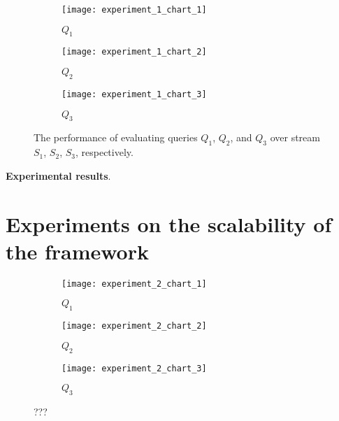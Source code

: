 \begin{figure}[H]
     \begin{adjustbox}{max width=1.5\linewidth,center}
     \centering
     \begin{subfigure}[b]{0.45\textwidth}
         \centering
         \texttt{[image: experiment\_1\_chart\_1]}
         \caption{$Q_{1}$}
         \label{fig:experiment:1:subfigure:1}
     \end{subfigure}
     \hfill
     \begin{subfigure}[b]{0.45\textwidth}
         \centering
         \texttt{[image: experiment\_1\_chart\_2]}
         \caption{$Q_{2}$}
         \label{fig:experiment:1:subfigure:2}
     \end{subfigure}
     \hfill
     \begin{subfigure}[b]{0.45\textwidth}
         \centering
         \texttt{[image: experiment\_1\_chart\_3]}
         \caption{$Q_{3}$}
         \label{fig:experiment:1:subfigure:3}
     \end{subfigure}
     \end{adjustbox}
     \caption{The performance of evaluating queries $Q_{1}$, $Q_{2}$, and $Q_{3}$ over stream $S_{1}$, $S_{2}$, $S_{3}$, respectively.}
     \label{fig:experiment:1}
\end{figure}

\textbf{Experimental results}.

\section{Experiments on the scalability of the framework}\label{sec:scalability}


\begin{figure}[H]
     \begin{adjustbox}{max width=1.5\linewidth,center}
     \centering
     \begin{subfigure}[b]{0.45\textwidth}
         \centering
         \texttt{[image: experiment\_2\_chart\_1]}
         \caption{$Q_{1}$}
         \label{fig:experiment:2:subfigure:1}
     \end{subfigure}
     \begin{subfigure}[b]{0.45\textwidth}
         \centering
         \texttt{[image: experiment\_2\_chart\_2]}
         \caption{$Q_{2}$}
         \label{fig:experiment:2:subfigure:2}
     \end{subfigure}
     \begin{subfigure}[b]{0.45\textwidth}
         \centering
         \texttt{[image: experiment\_2\_chart\_3]}
         \caption{$Q_{3}$}
         \label{fig:experiment:2:subfigure:3}
     \end{subfigure}
     \end{adjustbox}
     \caption{???}
     \label{fig:experiment:2}
\end{figure}

